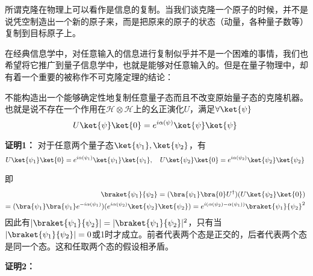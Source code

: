 
所谓克隆在物理上可以看作是信息的复制。当我们谈克隆一个原子的时候，并不是说凭空制造出一个新的原子来，而是把原来的原子的状态（动量，各种量子数等）复制到目标原子上。

在经典信息学中，对任意输入的信息进行复制似乎并不是一个困难的事情，我们也希望将它推广到量子信息学中，也就是能够对任意输入的。但是在量子物理中，却有着一个重要的被称作不可克隆定理的结论：
\begin{theorem}{}
不能构造出一个能够确定性地复制任意量子态而且不改变原始量子态的克隆机器。也就是说不存在一个作用在$\mathcal{H}\otimes\mathcal{H}$上的幺正演化$U$，满足$\forall\ket{\psi}$
\begin{equation}
U\ket{\psi}\ket{0}=e^{i\alpha(\psi)}\ket{\psi}\ket{\psi}~
\end{equation}
\end{theorem}

\textbf{证明1：}
对于任意两个量子态$\ket{\psi_1},\ket{\psi_2}$，有\begin{equation}
 U\ket{\psi_1}\ket{0}=e^{i\alpha(\psi_1)}\ket{\psi_1}\ket{\psi_1},\quad U\ket{\psi_2}\ket{0}=e^{i\alpha(\psi_2)}\ket{\psi_2}\ket{\psi_2}~
\end{equation}

即
\begin{equation}
\begin{aligned}
\braket{\psi_1}{\psi_2}=(\bra{\psi_1}\bra{0}U^\dagger)(U\ket{\psi_2}\ket{0})\\
=(\bra{\psi_1}\bra{\psi_1}e^{-i\alpha(\psi_1)})(e^{i\alpha(\psi_2)}\ket{\psi_2}\ket{\psi_2})=e^{i(\alpha(\psi_2)-\alpha(\psi_1))}\braket{\psi_1}{\psi_2}^2
\end{aligned}~
\end{equation}
因此有$|\braket{\psi_1}{\psi_2}|=|\braket{\psi_1}{\psi_2}|^2$，只有当$|\braket{\psi_1}{\psi_2}|=0$或1时才成立。前者代表两个态是正交的，后者代表两个态是同一个态。这和任取两个态的假设相矛盾。

\textbf{证明2：}



